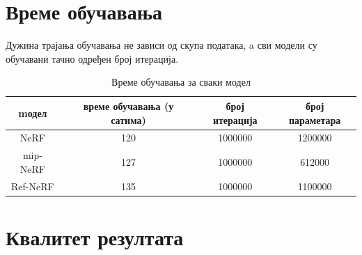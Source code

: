 \documentclass[12pt, a4paper, twoside]{book}
\numberwithin{equation}{chapter}
\numberwithin{theorem}{section}
\numberwithin{definition}{section}
\numberwithin{definitionChapter}{chapter}
\begin{document}
\section{Време обучавања}

Дужина трајања обучавања не зависи од скупа података, a сви модели су обучавани тачно одређен број итерација.

	\begin{table}[H]
		\centering
		\begin{tabular}{cccc} \toprule
			{mодел} 	& {време обучавања (у сатима)} 	& {број итерација} & {број параметара} \\ \midrule
			{NeRF} 		& 120 							& 1000000 & 1200000\\ 
			{mip-NeRF} 	& 127 							& 1000000 & 612000\\
			{Ref-NeRF} 	& 135 							& 1000000 & 1100000\\ \bottomrule
		\end{tabular}
		\caption{Време обучавања за сваки модел}
		\label{table-duration}
	\end{table}


\section{Квалитет резултата}
\end{document}
